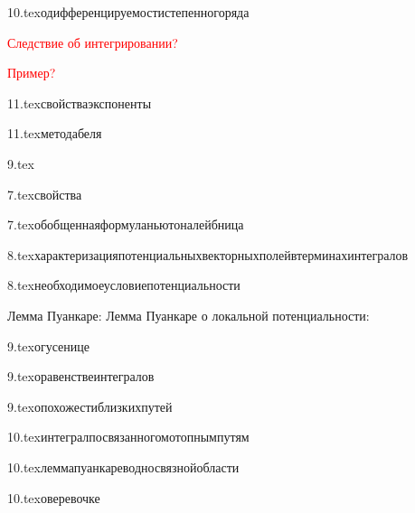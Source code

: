 {10.tex}{одифференцируемостистепенногоряда}

\textcolor{red}{Следствие об интегрировании?}

\textcolor{red}{Пример?}

{11.tex}{свойстваэкспоненты}

{11.tex}{методабеля}

{9.tex}{}\?

{7.tex}{свойства}

{7.tex}{обобщеннаяформуланьютоналейбница}

{8.tex}{характеризацияпотенциальныхвекторныхполейвтерминахинтегралов}

{8.tex}{необходимоеусловиепотенциальности}

Лемма Пуанкаре:
Лемма Пуанкаре о локальной потенциальности:

{9.tex}{огусенице}

{9.tex}{оравенствеинтегралов}

{9.tex}{опохожестиблизкихпутей}

{10.tex}{интегралпосвязанногомотопнымпутям}

{10.tex}{леммапуанкареводносвязнойобласти}

{10.tex}{оверевочке}

